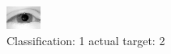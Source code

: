 \begin{figure}[h!]
\begin{center}
\includegraphics[width=0.60\columnwidth]{figures/ID2353_class_1_target_2.png}
\end{center}
\caption{ Classification: 1 actual target: 2}
\label{fig:ID2353_class_1_target_2}
\end{figure}
